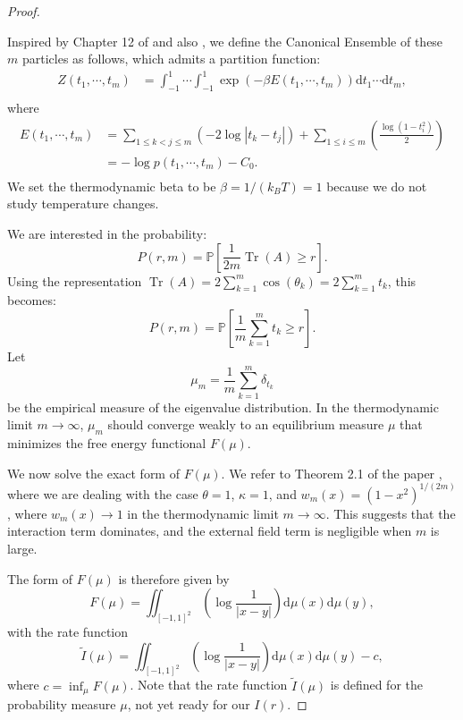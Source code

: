 \documentclass{article} %
\DeclareMathOperator{\Tr}{Tr}
\begin{document}
\begin{proof}
\begin{enumerate}
    \end{enumerate}
    Inspired by Chapter 12 of \citet{Mehta2004} and also \citet{TOUCHETTE20091}, 
    we define the Canonical Ensemble of these $m$ particles as follows, which admits a partition function:
    \[
    \begin{aligned}
        Z(t_1, \cdots, t_m) &= \int_{-1}^{1} \cdots \int_{-1}^{1} \exp({-\beta E(t_1, \cdots, t_m)}) \mathrm{d}t_1 \cdots\mathrm{d}t_m, \\
    \end{aligned}
    \]
    where
    \[
    \begin{aligned}
    E(t_1, \cdots, t_m) 
    &= \sum_{1\leq k<j\leq m} \left(-2 \log|t_k - t_j| \right) + \sum_{1\leq i \leq m} \left(\frac{\log (1-t_i^2)}{2}\right) \\
    &= -\log p(t_1, \cdots, t_m) - C_0.\\ 
    \end{aligned}
    \]
    We set the thermodynamic beta to be $\beta = 1/(k_B T) = 1$ because we do not study temperature changes. 

    We are interested in the probability:
    \[
    P(r, m) = \mathbb{P}\left[\frac{1}{2m} \Tr(A) \geq r\right].
    \]
    Using the representation $\Tr(A) = 2 \sum_{k=1}^m \cos(\theta_k) = 2 \sum_{k=1}^m t_k$, this becomes:
    \[
    P(r, m) = \mathbb{P}\left[\frac{1}{m} \sum_{k=1}^m t_k \geq r\right].
    \]
    Let \[\mu_m = \frac{1}{m} \sum_{k=1}^m \delta_{t_k}\] be the empirical measure of the eigenvalue distribution. 
    In the thermodynamic limit $m \to \infty$, $\mu_m$ should converge weakly to an equilibrium measure $\mu$ that minimizes the free energy functional $F(\mu)$. 

    We now solve the exact form of $F(\mu)$. We refer to Theorem 2.1 of the paper \citep{Eichelsbacher_2011},
    where we are dealing with the case $\theta = 1$, $\kappa = 1$, and $w_m (x) = (1-x^2)^{1/(2m)}$, where $w_m (x) \to 1$
    in the thermodynamic limit $m \to \infty$. This suggests that the interaction term dominates, and the external field term
    is negligible when $m$ is large. 

    The form of $F(\mu)$ is therefore given by
    \[
    F(\mu) = \iint_{[-1, 1]^2} \left( \log \frac{1}{|x-y|} \right) \mathrm{d} \mu(x) \mathrm{d} \mu(y),
    \]
    with the rate function
    \[
    \tilde{I}(\mu) = \iint_{[-1, 1]^2} \left( \log \frac{1}{|x-y|} \right) \mathrm{d} \mu(x) \mathrm{d} \mu(y) - c,
    \]
    where $c = \inf_\mu F(\mu)$. Note that the rate function $\tilde{I}(\mu)$ is defined for the probability measure $\mu$, not yet 
    ready for our $I(r)$. 
    

\end{proof}
\end{document}
